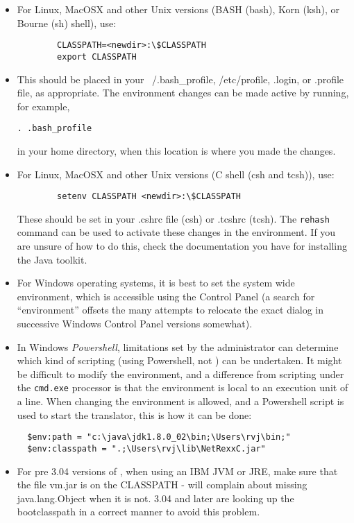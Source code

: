 \begin{itemize}
\item For Linux, MacOSX and other Unix versions (BASH (bash), Korn
  (ksh), or Bourne (sh) shell), use:
\begin{lstlisting}
        CLASSPATH=<newdir>:\$CLASSPATH 
        export CLASSPATH
\end{lstlisting}
\item This should be placed
  in your ~/.bash\_profile, /etc/profile, .login, or .profile file, as
  appropriate. The environment changes can be made active by running,
  for example,
\begin{lstlisting}
. .bash_profile
\end{lstlisting}
in your home directory, when this location is where you made the changes.
\item For Linux, MacOSX and other Unix versions (C shell (csh and tcsh)), use:
\begin{lstlisting}
        setenv CLASSPATH <newdir>:\$CLASSPATH 
\end{lstlisting}
These should be set in your .cshrc file (csh) or .tcshrc (tcsh). The
\texttt{rehash} command can be used to activate these changes in the environment. If you are unsure of how to do this, check the
documentation you have for installing the Java toolkit.
\item For Windows operating systems, it is best to set the system wide
  environment, which is accessible using the Control Panel (a search
  for ``environment'' offsets the many attempts to relocate the exact
  dialog in successive Windows Control Panel versions somewhat).
\item In Windows \emph{Powershell}, limitations set by the
  administrator can determine which kind of scripting (using
  Powershell, not \nr) can be undertaken. It might be difficult to
  modify the environment, and a difference from scripting under the
  \texttt{cmd.exe} processor is that the environment is local to an
  execution unit of a line. When changing the environment is allowed,
  and a Powershell script is used to start the \nr{} translator, this is
  how it can be done:
\begin{lstlisting}
  $env:path = "c:\java\jdk1.8.0_02\bin;\Users\rvj\bin;"
  $env:classpath = ".;\Users\rvj\lib\NetRexxC.jar"
\end{lstlisting}
 \item For pre 3.04 versions of \nr{}, when using an IBM JVM or JRE, make sure that the file vm.jar is
   on the CLASSPATH - \nr{} will complain about missing
   java.lang.Object when it is not. \nr{} 3.04 and later are looking
   up the bootclasspath in a correct manner to avoid this problem.
\end{itemize}

